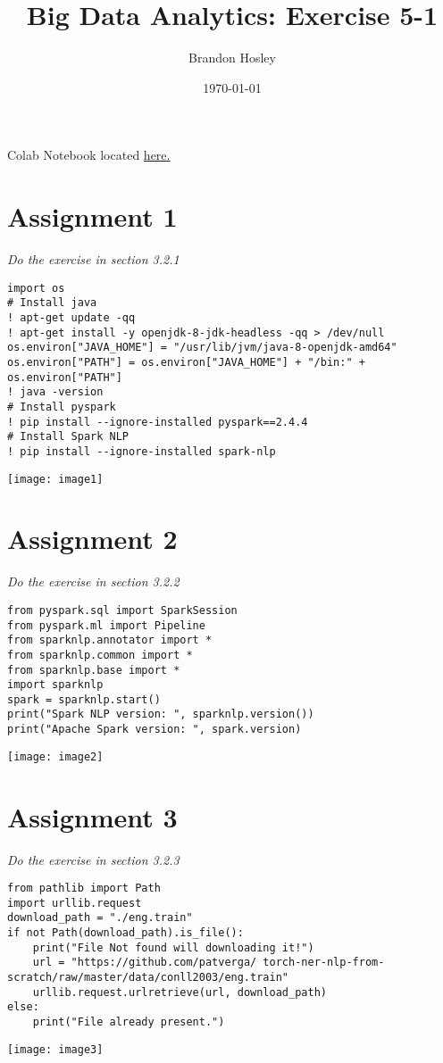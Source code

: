 \documentclass[]{article}
\title{Big Data Analytics: Exercise 5-1}
\author{Brandon Hosley}
\date{\today}
\begin{document}
\maketitle

Colab Notebook located
\href{https://colab.research.google.com/drive/1mYCMNMlFkMpaQ3inTh2sF-T1988I0Do4?usp=sharing}{here.}

\section*{Assignment 1}
\emph{ Do the exercise in section 3.2.1 }

\begin{verbatim}
import os
# Install java
! apt-get update -qq
! apt-get install -y openjdk-8-jdk-headless -qq > /dev/null
os.environ["JAVA_HOME"] = "/usr/lib/jvm/java-8-openjdk-amd64"
os.environ["PATH"] = os.environ["JAVA_HOME"] + "/bin:" + os.environ["PATH"]
! java -version
# Install pyspark
! pip install --ignore-installed pyspark==2.4.4
# Install Spark NLP
! pip install --ignore-installed spark-nlp
\end{verbatim}
\texttt{[image: image1]} %


\section*{Assignment 2}
\emph{ Do the exercise in section 3.2.2 }

\begin{verbatim}
from pyspark.sql import SparkSession
from pyspark.ml import Pipeline
from sparknlp.annotator import *
from sparknlp.common import *
from sparknlp.base import *
import sparknlp
spark = sparknlp.start()
print("Spark NLP version: ", sparknlp.version())
print("Apache Spark version: ", spark.version)
\end{verbatim}
\texttt{[image: image2]} %


\section*{Assignment 3}
\emph{ Do the exercise in section 3.2.3 }

\begin{verbatim}
from pathlib import Path
import urllib.request
download_path = "./eng.train"
if not Path(download_path).is_file():
	print("File Not found will downloading it!")
	url = "https://github.com/patverga/ torch-ner-nlp-from-scratch/raw/master/data/conll2003/eng.train"
	urllib.request.urlretrieve(url, download_path)
else:
	print("File already present.")
\end{verbatim}
\texttt{[image: image3]} %
\end{document}
